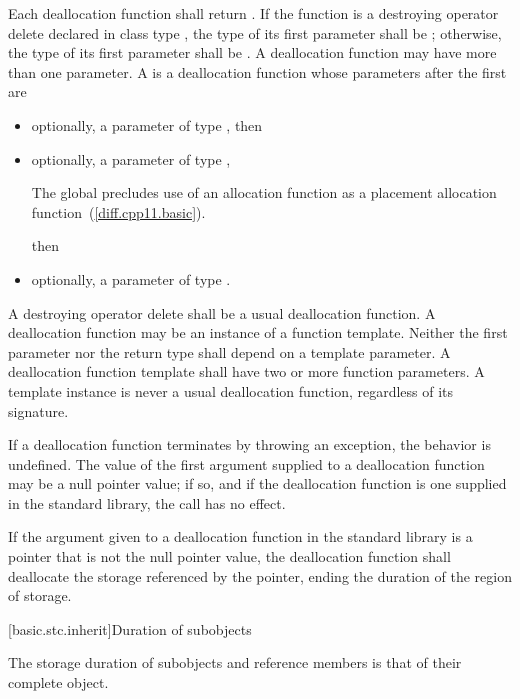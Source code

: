 \pnum
{}%
Each deallocation function shall return .
If the function is a destroying operator delete
declared in class type ,
the type of its first parameter shall be ;
otherwise, the type of its first
parameter shall be . A deallocation function may have more
than one parameter.
%
A  is a deallocation function
whose parameters after the first are
\begin{itemize}
\item
optionally, a parameter of type , then
\item
optionally, a parameter of type ,
\begin{footnote}
The global 
precludes use of an
allocation function  as a placement
allocation function~(\ref{diff.cpp11.basic}).
\end{footnote}
then
\item
optionally, a parameter of type .
\end{itemize}
A destroying operator delete shall be a usual deallocation function.
A deallocation function may be an instance of a function
template. Neither the first parameter nor the return type shall depend
on a template parameter.
A deallocation
function template shall have two or more function parameters. A template
instance is never a usual deallocation function, regardless of its
signature.

\pnum
If a deallocation function terminates by throwing an exception, the behavior is undefined.
The value of the first argument supplied to a deallocation function may
be a null pointer value; if so, and if the deallocation function is one
supplied in the standard library, the call has no effect.

\pnum
If the argument given to a deallocation function in the standard library
is a pointer that is not the null pointer value, the
deallocation function shall deallocate the storage referenced by the
pointer, ending the duration of the region of storage.

[basic.stc.inherit]{Duration of subobjects}

\pnum
{}%
The storage duration of subobjects and reference members
is that of their complete object.
%

